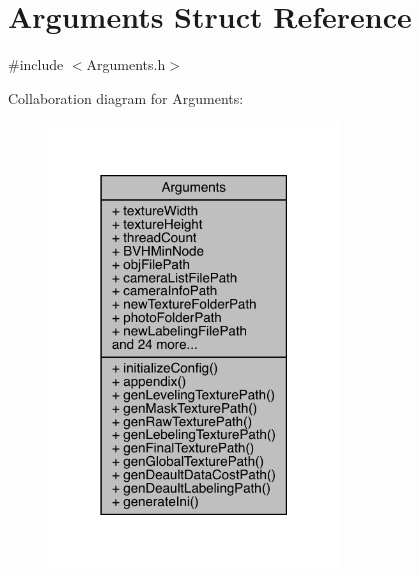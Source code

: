 \hypertarget{struct_arguments}{}\section{Arguments Struct Reference}
\label{struct_arguments}


{\ttfamily \#include $<$Arguments.\+h$>$}



Collaboration diagram for Arguments\+:\nopagebreak
\begin{figure}[H]
\begin{center}
\leavevmode
\includegraphics[width=219pt]{struct_arguments__coll__graph}
\end{center}
\end{figure}
